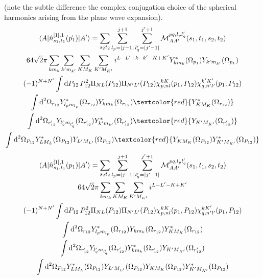 \documentclass[10pt]{article}
\begin{document}
(note the subtle difference the complex conjugation choice of the spherical 
harmonics arising from the plane wave expansion).
\begin{multline*}
\braket{ A | \hat{n}^{[1],1}_{s_1,t_1}(\vec{p}_1) | A'} = \sum_{s_2 t_2}  
\sum_{l_p = |j-1|}^{j+1} \sum_{l_q' = |j' - 1|}^{j'+1} \mathcal{M}_{AA'}^{p 
q,l_p l_q'}(s_1,t_1,s_2,t_2) \\
64 \sqrt{2} \pi \sum_{k m_k} \sum_{k' m_{k'}} \sum_{K M_K} \sum_{K' M_{K'}} 
i^{L-L'+k-k'-K+K'} Y_{k m_k}^{*}(\Omega_{p_1}) Y_{k' m_{k'}}(\Omega_{p_1}) \\
 (-1)^{N+N'} \int \text{d} P_{12} \, P_{12}^{2} \Pi_{N L}(P_{12}) \Pi_{N' 
L'}(P_{12}) \chi_{p,nl}^{kK}(p_1,P_{12}) \chi_{q,n'l'}^{k'K'}(p_1,P_{12}) \\
 \int \text{d}^{2} \Omega_{r_{12}}  Y_{l_p m_{l_p} }^{*}(\Omega_{r_{12}}) Y_{k 
m_k}(\Omega_{r_{12}}) \textcolor{red}{Y_{K M_K}^{*}(\Omega_{r_{12}})} \\
 \int \text{d}^{2} \Omega_{r_{12}'}  Y_{ l_q' m_{l_q'} }(\Omega_{r_{12}'})  
Y_{k' m_{k'}}^{*}(\Omega_{r_{12}'}) \textcolor{red}{Y_{K' 
M_{K'}}(\Omega_{r_{12}'})}
\\
   \int \text{d}^{2} \Omega_{P_{12}}  Y_{L M_L}^{*}(\Omega_{P_{12}})  Y_{L' 
M_{L'}}(\Omega_{P_{12}}) \textcolor{red}{Y_{K M_K}(\Omega_{P_{12}}) Y_{K' 
M_{K'}}^{*}(\Omega_{P_{12}})}
\end{multline*}
\begin{multline*}
\braket{ A | \hat{n}^{[1],1}_{s_1,t_1}(p_1) | A'} = \sum_{s_2 t_2}  \sum_{l_p = 
|j-1|}^{j+1} \sum_{l_q' = |j' - 1|}^{j'+1} \mathcal{M}_{AA'}^{p q,l_p 
l_q'}(s_1,t_1,s_2,t_2) \\
64 \sqrt{2} \pi \sum_{k m_k} \sum_{K M_K} \sum_{K' M_{K'}} i^{L-L'-K+K'}  \\
 (-1)^{N+N'} \int \text{d} P_{12} \, P_{12}^{2} \Pi_{N L}(P_{12}) \Pi_{N' 
L'}(P_{12}) \chi_{p,nl}^{kK}(p_1,P_{12}) \chi_{q,n'l'}^{kK'}(p_1,P_{12}) \\
 \int \text{d}^{2} \Omega_{r_{12}}  Y_{l_p m_{l_p} }^{*}(\Omega_{r_{12}}) Y_{k 
m_k}(\Omega_{r_{12}}) Y_{K M_K}^{*}(\Omega_{r_{12}}) \\
 \int \text{d}^{2} \Omega_{r_{12}'}  Y_{ l_q' m_{l_q'} }(\Omega_{r_{12}'})  
Y_{k m_k}^{*}(\Omega_{r_{12}'}) Y_{K' M_{K'}}(\Omega_{r_{12}'}) \\
   \int \text{d}^{2} \Omega_{P_{12}}  Y_{L M_L}^{*}(\Omega_{P_{12}})  Y_{L' 
M_{L'}}(\Omega_{P_{12}}) Y_{K M_K}(\Omega_{P_{12}}) Y_{K' 
M_{K'}}^{*}(\Omega_{P_{12}})
\end{multline*}
\end{document}
